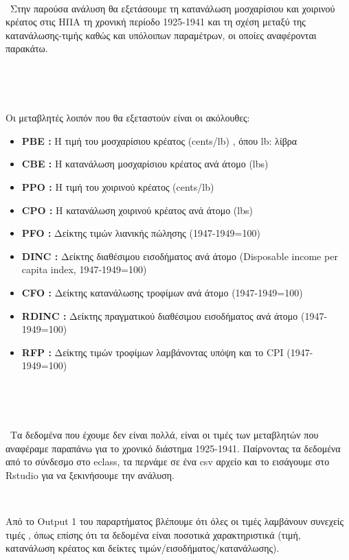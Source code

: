 \documentclass[10pt]{article}
\begin{document}
\




\
Στην παρούσα ανάλυση θα εξετάσουμε τη κατανάλωση μοσχαρίσιου και χοιρινού κρέατος στις ΗΠΑ τη χρονική περίοδο 1925-1941 και τη σχέση μεταξύ της κατανάλωσης-τιμής καθώς και υπόλοιπων παραμέτρων, οι οποίες αναφέρονται παρακάτω.

\




\

Οι μεταβλητές λοιπόν που θα εξεταστούν είναι οι ακόλουθες:
\\
\begin{itemize}
    \item \textbf{PBE :} Η τιμή του μοσχαρίσιου κρέατος (cents/lb) , όπου lb: λίβρα
    \item \textbf{CBE :} Η κατανάλωση μοσχαρίσιου κρέατος ανά άτομο (lbs)
    \item \textbf{PPO :} Η τιμή του χοιρινού κρέατος (cents/lb)
    \item \textbf{CPO :} Η κατανάλωση χοιρινού κρέατος ανά άτομο (lbs)
    \item \textbf{PFO :} Δείκτης τιμών λιανικής πώλησης (1947-1949=100)
    \item \textbf{DINC :} Δείκτης διαθέσιμου εισοδήματος ανά άτομο (Disposable income per capita index, 1947-1949=100)
    \item \textbf{CFO :} Δείκτης κατανάλωσης τροφίμων ανά άτομο (1947-1949=100)
    \item \textbf{RDINC :} Δείκτης πραγματικού διαθέσιμου εισοδήματος ανά άτομο (1947-1949=100)
    \item \textbf{RFP :} Δείκτης τιμών τροφίμων λαμβάνοντας υπόψη και το CPI (1947-1949=100)
\end{itemize}

\




\



\
Τα δεδομένα που έχουμε δεν είναι πολλά, είναι οι τιμές των μεταβλητών που αναφέραμε παραπάνω για το χρονικό διάστημα 1925-1941. Παίρνοντας τα δεδομένα από το σύνδεσμο στο eclass, τα περνάμε σε ένα csv αρχείο και το εισάγουμε στο Rstudio για να ξεκινήσουμε την ανάλυση.


\



Από το Output 1 του παραρτήματος βλέπουμε ότι όλες οι τιμές λαμβάνουν συνεχείς τιμές , όπως επίσης ότι τα δεδομένα είναι ποσοτικά χαρακτηριστικά (τιμή, κατανάλωση κρέατος και δείκτες τιμών/εισοδήματος/κατανάλωσης).
\
\end{document}
